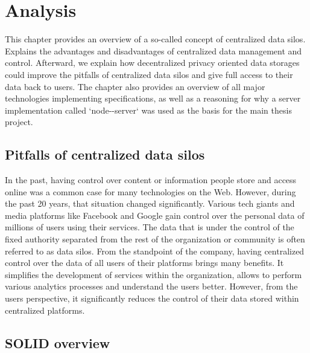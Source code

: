 \chapter{Analysis}
\label{chap:num_3}


This chapter provides an overview of a so-called concept of centralized data silos. Explains the advantages and disadvantages of centralized data management and control. Afterward, we explain how decentralized privacy oriented data storages could improve the pitfalls of centralized data silos and give full access to their data back to users. The chapter also provides an overview of all major technologies implementing \solid{} specifications, as well as a reasoning for why a server implementation called `node-\solid{}-server` was used as the basis for the main thesis project. 


\section{Pitfalls of centralized data silos}

In the past, having control over content or information people store and access online was a common case for many technologies on the Web. However, during the past 20 years, that situation changed significantly. Various tech giants and media platforms like Facebook and Google gain control over the personal data of millions of users using their services. The data that is under the control of the fixed authority separated from the rest of the organization or community is often referred to as data silos.  From the standpoint of the company, having centralized control over the data of all users of their platforms brings many benefits. It simplifies the development of services within the organization, allows to perform various analytics processes and understand the users better. However, from the users perspective, it significantly reduces the control of their data stored within centralized platforms.

\section{SOLID overview}

